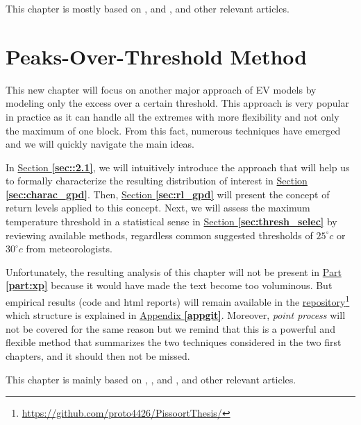 \documentclass[11pt,a4paper,openany, twosided]{book}
\begin{document}
This chapter is mostly based on \citet[chap.3]{coles_introduction_2001}, \citet[chap.2]{beirlant_statistics_2006} and \citet[chap.1-4]{reiss_statistical_2007}, and other relevant articles.

\newpage




\chapter{Peaks-Over-Threshold Method}\label{sec::2}
\vspace{-1cm}
\minitoc \thispagestyle{empty}
 \vspace{1cm}

This new chapter will focus on another major approach of EV models by modeling only the excess over a certain threshold. This approach is very popular in practice as it can handle all the extremes with more flexibility and not only the maximum of one block. From this fact, numerous techniques have emerged and we will quickly navigate the main ideas.

In \hyperref[sec::2.1]{Section \textbf{\ref{sec::2.1}}}, we will intuitively introduce the approach that will help us 
to formally characterize the resulting distribution of interest in \hyperref[sec:charac_gpd]{Section \textbf{\ref{sec:charac_gpd}}}. Then, \hyperref[sec:rl_gpd]{Section \textbf{\ref{sec:rl_gpd}}} will present the concept of return levels applied to this concept. Next, we will assess the maximum temperature threshold in a statistical sense in \hyperref[sec:thresh_selec]{Section \textbf{\ref{sec:thresh_selec}}} by reviewing available methods, regardless common suggested thresholds of $25^{\circ} c$ or $30^{\circ} c$ from meteorologists.

Unfortunately, the resulting analysis of this chapter will not be present in \hyperref[part:xp]{Part \textbf{\ref{part:xp}}} because it would have made the text become too voluminous. But empirical results (code and html reports) will remain available in the \href{https://github.com/proto4426/PissoortThesis/}{repository}\footnote{\url{https://github.com/proto4426/PissoortThesis/}} which structure is explained in \hyperref[appgit]{Appendix \textbf{\ref{appgit}}}. Moreover, \emph{point process} will not be covered for the same reason but we remind that this is a powerful and flexible method that summarizes the two techniques considered in the two first chapters, and it should then not be missed. 

This chapter is mainly based on \citet[chap.4 and 7]{coles_introduction_2001}, \citet[chap.4]{beirlant_statistics_2006}, \citet[chap.5]{reiss_statistical_2007} and 
\citet[chap.5]{embrechts_modelling_2011},
 and other relevant articles.
\end{document}
